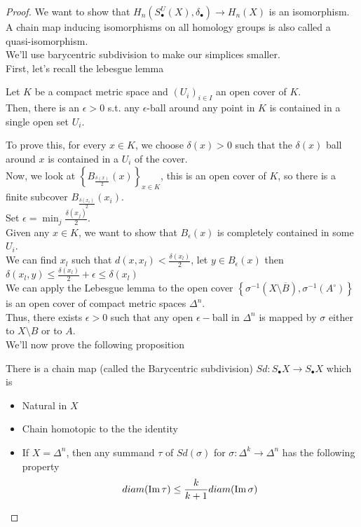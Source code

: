 \documentclass[../main.tex]{subfiles}
\begin{document}
\begin{proof}
We want to show that $H_n( S_\bullet^{U}( X) ,\delta_\bullet) \to H_n( X) $ is an isomorphism.\\
A chain map inducing isomorphisms on all homology groups is also called a quasi-isomorphism.\\
We'll use barycentric subdivision to make our simplices smaller.\\
First, let's recall the lebesgue lemma
\begin{lemma}
Let $K$ be a compact metric space and $( U_i)_{i \in I} $ an open cover of $K$.\\
Then, there is an $\epsilon>0$ s.t. any $\epsilon$-ball around any point in $K$ is contained in a single open set $U_i$.
\end{lemma}
To prove this, for every $x\in K$, we choose $\delta( x) >0$ such that the $\delta( x) $ ball around $x$ is contained in a $U_i$ of the cover.\\
Now, we look at $ \left\{ B_{ \frac{\delta( x) }{2}} ( x)  \right\}_{x\in K} $, this is an open cover of $K$, so there is a finite subcover $ B_{ \frac{\delta( x_i) }{2}} ( x_i) $.\\
Set $\epsilon = \min_j \frac{\delta( x_j) }{2}$.\\
Given any $x\in K$, we want to show that $B_{\epsilon} ( x) $ is completely contained in some $U_i$.\\
We can find $x_l$ such that $d( x,x_l) < \frac{\delta( x_l) }{2}$, let $y\in B_\epsilon( x) $  then $\delta( x_l,y)	\leq  \frac{\delta( x_l) }{2} + \epsilon \leq  \delta( x_l)  $ \\

We can apply the Lebesgue lemma to the open cover $ \left\{ \sigma^{-1}( X\setminus \overline{B}) , \sigma^{-1}( A^{\circ})  \right\} $ is an open cover of compact metric spaces $\Delta^{n}$.\\
Thus, there exists $\epsilon>0$ such that  any open $\epsilon-$ball in $\Delta^{n}$ is mapped by $\sigma$ either to $X\setminus B$ or to $A$.\\
We'll now prove the following proposition
\begin{propo}
There is a chain map (called the Barycentric subdivision)  $Sd: S_\bullet X\to S_{\bullet} X$
which is
\begin{itemize}
\item Natural in $X$ 
\item Chain homotopic to the the identity
\item If $X= \Delta^{n}$, then any summand $\tau$ of $Sd( \sigma) $ for $\sigma: \Delta^{k}\to \Delta^{n}$ has the following property
	\[ 
	diam( \operatorname{Im}\tau) \leq  \frac{k}{k+1}diam ( \operatorname{Im} \sigma) 
	\]
	

\end{itemize}
\end{propo}
\end{proof}
\end{document}
